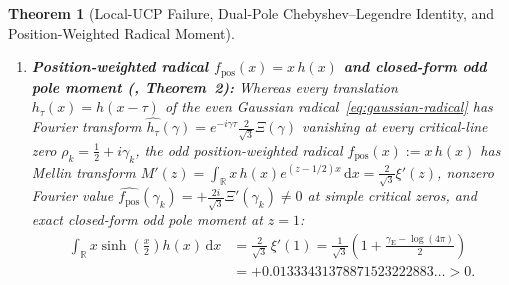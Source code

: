 \documentclass[11pt]{article}
\newtheorem{theorem}{Theorem}[section]
\theoremstyle{remark}
\newcommand{\dd}{\mathrm d}
\begin{document}
\begin{theorem}[Local-UCP Failure, Dual-Pole Chebyshev--Legendre Identity, and Position-Weighted Radical Moment]
\begin{enumerate}[label=(\alph*)]
\begin{equation}
  \end{equation}
  Consequently, with the dual-pole Chebyshev remainder $\widetilde{R}_\psi(x) := \psi(x) - x - \log x + 1$, Stieltjes integration by parts on $[1, e^{2a}]$ produces \textbf{identically zero boundary terms at both endpoints} ($\widetilde{R}_\psi(1) = 0$ and $\widetilde{C}_{m,n}(2) = 0$) and yields the exact identity
  \begin{equation}\label{eq:dual-pole-ibp}
    \bigl(T_{\mathrm{arith}}(a) - T_{\mathrm{pole}}(a)\bigr)_{m,n} = \int_0^2 \frac{\psi(e^{au}) - e^{au} - au + 1}{e^{au/2}}\,\bigl(a\,\widetilde{C}_{m,n}(u) - 2\,\widetilde{C}_{m,n}'(u)\bigr)\,\dd u.
  \end{equation}
  \item \textbf{Position-weighted radical $f_{\mathrm{pos}}(x) = x\,h(x)$ and closed-form odd pole moment (, Theorem~2):} Whereas every translation $h_\tau(x) = h(x-\tau)$ of the even Gaussian radical~\eqref{eq:gaussian-radical} has Fourier transform $\widehat{h_\tau}(\gamma) = e^{-i\gamma\tau}\frac{2}{\sqrt{3}}\Xi(\gamma)$ vanishing at every critical-line zero $\rho_k = \tfrac{1}{2} + i\gamma_k$, the odd position-weighted radical $f_{\mathrm{pos}}(x) := x\,h(x)$ has Mellin transform $M'(z) = \int_{\mathbb{R}} x\,h(x)e^{(z-1/2)x}\,\dd x = \frac{2}{\sqrt{3}}\xi'(z)$, nonzero Fourier value $\widehat{f_{\mathrm{pos}}}(\gamma_k) = +\frac{2i}{\sqrt{3}}\Xi'(\gamma_k) \ne 0$ at simple critical zeros, and exact closed-form odd pole moment at $z = 1$:
  \begin{align}\label{eq:odd-pole-moment-closed}
    \int_{\mathbb{R}} x\sinh\!\left(\frac{x}{2}\right)h(x)\,\dd x &= \frac{2}{\sqrt{3}}\,\xi'(1) = \frac{1}{\sqrt{3}}\!\left(1 + \frac{\gamma_{\mathrm{E}} - \log(4\pi)}{2}\right) \nonumber\\
    &= +0.01333431378871523222883\dots > 0.
  \end{align}
\end{enumerate}
\end{theorem}
\end{document}
